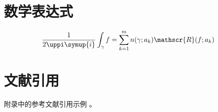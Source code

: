 \section{数学表达式}

\begin{equation}
  \frac{1}{2 \uppi \symup{i}} \int_\gamma f = \sum_{k=1}^m n(\gamma; a_k) \mathscr{R}(f; a_k)
  \label{eq:appendix-equation}
\end{equation}


\section{文献引用}

附录\cite{dupont1974bone}中的参考文献引用\cite{zhengkaiqing1987}示例
\cite{dupont1974bone,zhengkaiqing1987}。

\printbibliography
